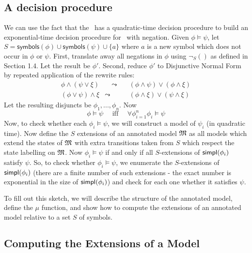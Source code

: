 \subsection{A decision procedure}

\NI We can use the fact that the \cathoristic\ has a quadratic-time
decision procedure to build an exponential-time decision procedure for
\cathoristic\ with negation.  Given $\phi \models \psi$, let $S =
\mathsf{symbols}(\phi) \cup \mathsf{symbols}(\psi) \cup \{a\}$ where
$a$ is a new symbol which does not occur in $\phi$ or $\psi$.  First,
translate away all negations in $\phi$ using $\neg_S()$ as defined in
Section 1.4.  Let the result be $\phi'$.  Second, reduce $\phi'$ to
Disjunctive Normal Form by repeated application of the rewrite rules:
\begin{eqnarray*}
\phi \land (\psi \lor \xi) & \quad \leadsto \quad& (\phi \land \psi) \lor (\phi \land \xi)  \\
(\phi \lor \psi) \land \xi & \leadsto & (\phi \land \xi) \lor (\psi \land \xi) 
\end{eqnarray*}
Let the resulting disjuncts be $\phi_1, ..., \phi_n$. 
Now 
\[
\phi \models \psi \quad\text{ iff }\quad \forall \phi_{i=1}^n \phi_i \models \psi
\]
Now, to check whether each $\phi_i \models \psi$, we will construct a
model of $\psi_i$ (in quadratic time).  Now define the $S$ extensions of
an annotated model $\frak{M}$ as all models which extend the states of
$\frak{M}$ with extra transitions taken from $S$ which respect the state
labelling on $\frak{M}$.  Now $\phi_i \models \psi$ if and only if all
$S$-extensions of $\mathsf{simpl}(\phi_i)$ satisfy $\psi$.  So, to check
whether $\phi_i \models \psi$, we enumerate the $S$-extensions of
$\mathsf{simpl}(\phi_i)$ (there are a finite number of such extensions - the
exact number is exponential in the size of $\mathsf{simpl}(\phi_i)$) and check
for each one whether it satisfies $\psi$.

To fill out this sketch, we will describe the structure of the
annotated model, define the $\mu$ function, and show how to compute
the extensions of an annotated model relative to a set $S$ of symbols.


\subsection{Computing the Extensions of a Model}

